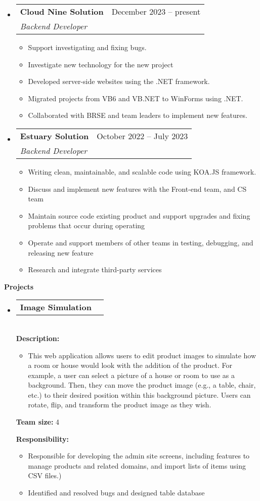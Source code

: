 \documentclass[letterpaper,12pt]{article}[leftmargin=*]
\makeatletter
\def \entryspacing {-0pt}
\renewcommand{\section}[2]{\vspace{5pt}
  \colorbox{secondary}{\color{white}\raggedbottom\normalsize\textbf{{#1}{\hspace{7pt}#2}}}
}
\newcommand{\resumeEntryStart}{\begin{itemize}[leftmargin=2.5mm]}
\newcommand{\resumeEntryEnd}{\end{itemize}\vspace{\entryspacing}}
\newcommand{\resumeItemListStart}{\begin{itemize}[leftmargin=4.5mm]}
\newcommand{\resumeItemListEnd}{\end{itemize}}
\newcommand{\resumeItem}[1]{
  \item\small{
    {#1 \vspace{-2pt}}
  }
}
\newcommand{\resumeEntryTSDL}[4]{
  \vspace{-1pt}\item[]
    \begin{tabularx}{0.97\textwidth}{X@{\hspace{60pt}}r}
      \textbf{\color{primary}#1} & {\firabook\color{accent}\small#2} \\
      \textit{\color{accent}\small#3} & \textit{\color{accent}\small#4} \\
    \end{tabularx}\vspace{-6pt}
}
\newcommand{\resumeEntryTD}[2]{
  \vspace{-1pt}\item[]
    \begin{tabularx}{0.97\textwidth}{X@{\hspace{60pt}}r}
      \textbf{\color{primary}#1} & {\firabook\color{accent}\small#2} \\
    \end{tabularx}\vspace{-6pt}
}
\makeatother
\begin{document}
  \resumeEntryStart
    \resumeEntryTSDL
      {Cloud Nine Solution}{December 2023 -- present}
      {Backend Developer}{}
    \resumeItemListStart
      
      \resumeItem {Support investigating and fixing bugs.}
      \resumeItem {Investigate new technology for the new project}
      \resumeItem {Developed server-side websites using the .NET framework.}
      \resumeItem{Migrated projects from VB6 and VB.NET to WinForms using .NET.}
      \resumeItem{Collaborated with BRSE and team leaders to implement new features.}
    \resumeItemListEnd
    \resumeEntryTSDL
      {Estuary Solution}{October 2022 -- July 2023}
      {Backend Developer}{}
    \resumeItemListStart
      \resumeItem {Writing clean, maintainable, and scalable code using KOA.JS framework.}
      \resumeItem {Discuss and implement new features with the Front-end team, and CS team}
      \resumeItem {Maintain source code existing product and support upgrades and fixing problems that occur during operating}
      \resumeItem{Operate and support members of other teams in testing, debugging, and releasing new feature}
      \resumeItem{Research and integrate third-party services}
    \resumeItemListEnd
  \resumeEntryEnd

\section{\faFlask}{Projects}


  \resumeEntryStart
    \resumeEntryTD
      { Image Simulation}{}

        \textbf{\\Description: }
        
            \resumeItemListStart
              \resumeItem {This web application allows users to edit product images to simulate how a room or house would look with the addition of the product. For example, a user can select a picture of a house or room to use as a background. Then, they can move the product image (e.g., a table, chair, etc.) to their desired position within this background picture. Users can rotate, flip, and transform the product image as they wish.}
            \resumeItemListEnd


        \textbf{Team size: }4

        
        \textbf{Responsibility: }
            \resumeItemListStart
                \resumeItem{Responsible for developing the admin site screens, including features to manage products and related domains, and import lists of items using CSV files.)}
                \resumeItem{Identified and resolved bugs and designed table database}
            \resumeItemListEnd
  \resumeEntryEnd
  
\end{document}
